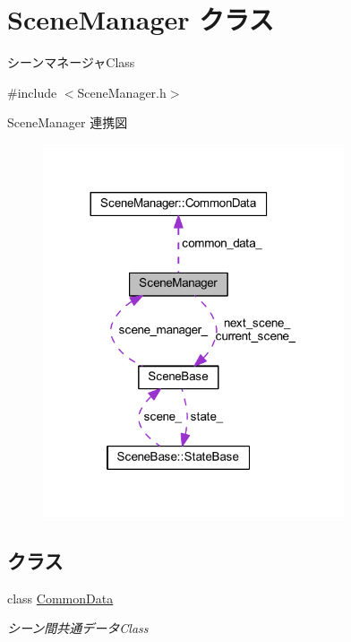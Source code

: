 \hypertarget{class_scene_manager}{}\section{Scene\+Manager クラス}
\label{class_scene_manager}


シーンマネージャ\+Class  




{\ttfamily \#include $<$Scene\+Manager.\+h$>$}



Scene\+Manager 連携図
\nopagebreak
\begin{figure}[H]
\begin{center}
\leavevmode
\includegraphics[width=252pt]{class_scene_manager__coll__graph}
\end{center}
\end{figure}
\subsection*{クラス}
\begin{DoxyCompactItemize}
\item 
class \mbox{\hyperlink{class_scene_manager_1_1_common_data}{Common\+Data}}
\begin{DoxyCompactList}\small\item\em シーン間共通データ\+Class \end{DoxyCompactList}\end{DoxyCompactItemize}
